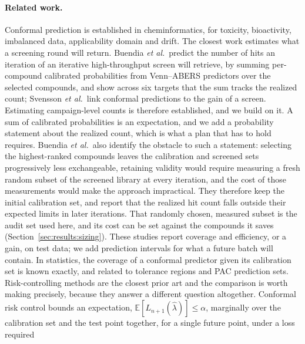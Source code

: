 \documentclass[twocolumn,10pt]{article}
\begin{document}
\paragraph{Related work.}
\label{sec:intro:related}
Conformal prediction is established in cheminformatics, for toxicity, bioactivity, imbalanced data, applicability domain and drift.\citep{Norinder2014,NorinderBoyer2017,Sun2017Mondrian,Svensson2017,Bosc2019,CortesCiriano2019,Morger2021,Geylan2024,CPSign2024,Laghuvarapu2023CoDrug} The closest work estimates what a screening round will return. Buendia \textit{et al.}\ predict the number of hits an iteration of an iterative high-throughput screen will retrieve, by summing per-compound calibrated probabilities from Venn--ABERS predictors over the selected compounds, and show across six targets that the sum tracks the realized count;\citep{Buendia2019Hit,Buendia2018VAP} Svensson \textit{et al.}\ link conformal predictions to the gain of a screen.\citep{Svensson2018Gain} Estimating campaign-level counts is therefore established, and we build on it. A sum of calibrated probabilities is an expectation, and we add a probability statement about the realized count, which is what a plan that has to hold requires. Buendia \textit{et al.}\ also identify the obstacle to such a statement: selecting the highest-ranked compounds leaves the calibration and screened sets progressively less exchangeable, retaining validity would require measuring a fresh random subset of the screened library at every iteration, and the cost of those measurements would make the approach impractical. They therefore keep the initial calibration set, and report that the realized hit count falls outside their expected limits in later iterations. That randomly chosen, measured subset is the audit set used here, and its cost can be set against the compounds it saves (Section~\ref{sec:results:sizing}). These studies report coverage and efficiency, or a gain, on test data; we add prediction intervals for what a future batch will contain. In statistics, the coverage of a conformal predictor given its calibration set is known exactly,\citep{Vovk2012PAC,Bian2023TrainingConditional,Marques2025Beta} and related to tolerance regions and PAC prediction sets.\citep{Wilks1941,Park2020PAC} Risk-controlling methods are the closest prior art and the comparison is worth making
precisely, because they answer a different question altogether. Conformal risk control bounds an expectation, $\mathbb{E}[L_{n+1}(\hat\lambda)]\le\alpha$,
marginally over the calibration set and the test point together, for a single future point, under a loss required
\end{document}
